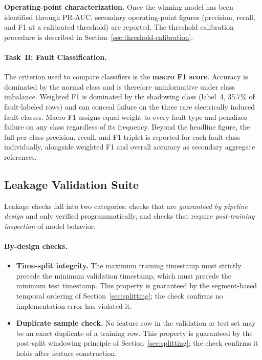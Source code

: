 \textbf{Operating-point characterization.} Once the winning model has been identified through PR-AUC, secondary operating-point figures (precision, recall, and F1 at a calibrated threshold) are reported. The threshold calibration procedure is described in Section~\ref{sec:threshold-calibration}.

\paragraph{Task~B: Fault Classification.}

The criterion used to compare classifiers is the \textbf{macro F1 score}. Accuracy is dominated by the normal class and is therefore uninformative under class imbalance. Weighted F1 is dominated by the shadowing class (label~4, 35.7\% of fault-labeled rows) and can conceal failure on the three rare electrically induced fault classes. Macro F1 assigns equal weight to every fault type and penalizes failure on any class regardless of its frequency. Beyond the headline figure, the full per-class precision, recall, and F1 triplet is reported for each fault class individually, alongside weighted F1 and overall accuracy as secondary aggregate references.

\subsection{Leakage Validation Suite}

Leakage checks fall into two categories: checks that are \emph{guaranteed by pipeline design} and only verified programmatically, and checks that require \emph{post-training inspection} of model behavior.

\paragraph{By-design checks.}
\begin{itemize}
    \item \textbf{Time-split integrity.} The maximum training timestamp must strictly precede the minimum validation timestamp, which must precede the minimum test timestamp. This property is guaranteed by the segment-based temporal ordering of Section~\ref{sec:splitting}; the check confirms no implementation error has violated it.
    \item \textbf{Duplicate sample check.} No feature row in the validation or test set may be an exact duplicate of a training row. This property is guaranteed by the post-split windowing principle of Section~\ref{sec:splitting}; the check confirms it holds after feature construction.
\end{itemize}

